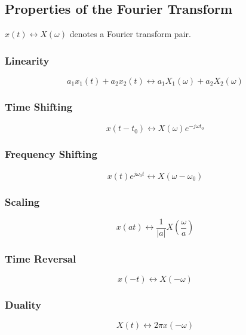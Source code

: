 \documentclass[]{article}
\begin{document}
\subsection{Properties of the Fourier Transform}
$ x(t) \longleftrightarrow X(\omega)$ denotes a Fourier transform pair.
\subsubsection{Linearity}
\begin{equation} a_{1} x_{1}(t) + a_{2} x_{2}(t) \longleftrightarrow a_{1} X_{1}(\omega) + a_{2} X_{2}(\omega)\label{fourier_linearity} \end{equation}
\subsubsection{Time Shifting}
\begin{equation} x(t-t_{0}) \longleftrightarrow X(\omega)e^{-j\omega t_{0}}\label{fourier_time_shifting} \end{equation}
\subsubsection{Frequency Shifting}
\begin{equation} x(t)e^{j\omega_{0} t} \longleftrightarrow X(\omega - \omega_{0})\label{fourier_frequency_shifting} \end{equation}
\subsubsection{Scaling}
\begin{equation} x(at) \longleftrightarrow \frac{1}{|a|}X(\frac{\omega}{a})\label{fourier_scaling} \end{equation}
\subsubsection{Time Reversal}
\begin{equation} x(-t) \longleftrightarrow X(-\omega)\label{fourier_time_reversal} \end{equation}
\subsubsection{Duality}
\begin{equation} X(t) \longleftrightarrow 2\pi x(-\omega)\label{fourier_duality} \end{equation}
\end{document}
